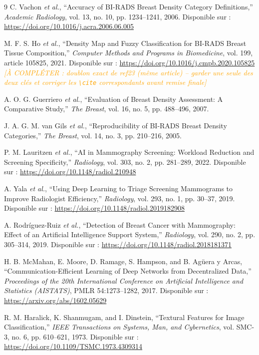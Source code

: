 \documentclass[12pt,a4paper]{report}
\newcommand{\todo}[1]{\textcolor{orange}{\textit{[À COMPLÉTER : #1]}}}
\begin{document}
\begin{thebibliography}{9}
C. Vachon \textit{et al.},
``Accuracy of BI-RADS Breast Density Category Definitions,''
\textit{Academic Radiology}, vol. 13, no. 10, pp. 1234--1241, 2006.
Disponible sur : \url{https://doi.org/10.1016/j.acra.2006.06.005}

M. F. S. Ho \textit{et al.},
``Density Map and Fuzzy Classification for BI-RADS Breast Tissue Composition,''
\textit{Computer Methods and Programs in Biomedicine}, vol. 199, article 105825, 2021.
Disponible sur : \url{https://doi.org/10.1016/j.cmpb.2020.105825}
\todo{doublon exact de ref23 (même article) -- garder une seule des deux
clés et corriger les \texttt{\textbackslash cite} correspondants avant
remise finale}

A. O. G. Guerriero \textit{et al.},
``Evaluation of Breast Density Assessment: A Comparative Study,''
\textit{The Breast}, vol. 16, no. 5, pp. 488--496, 2007.

J. A. G. M. van Gils \textit{et al.},
``Reproducibility of BI-RADS Breast Density Categories,''
\textit{The Breast}, vol. 14, no. 3, pp. 210--216, 2005.

P. M. Lauritzen \textit{et al.},
``AI in Mammography Screening: Workload Reduction and Screening Specificity,''
\textit{Radiology}, vol. 303, no. 2, pp. 281--289, 2022.
Disponible sur : \url{https://doi.org/10.1148/radiol.210948}

A. Yala \textit{et al.},
``Using Deep Learning to Triage Screening Mammograms to Improve Radiologist Efficiency,''
\textit{Radiology}, vol. 293, no. 1, pp. 30--37, 2019.
Disponible sur : \url{https://doi.org/10.1148/radiol.2019182908}

A. Rodríguez-Ruiz \textit{et al.},
``Detection of Breast Cancer with Mammography: Effect of an Artificial Intelligence Support System,''
\textit{Radiology}, vol. 290, no. 2, pp. 305--314, 2019.
Disponible sur : \url{https://doi.org/10.1148/radiol.2018181371}

H. B. McMahan, E. Moore, D. Ramage, S. Hampson, and B. Agüera y Arcas,
``Communication-Efficient Learning of Deep Networks from Decentralized Data,''
\textit{Proceedings of the 20th International Conference on Artificial Intelligence and Statistics (AISTATS)}, PMLR 54:1273--1282, 2017.
Disponible sur : \url{https://arxiv.org/abs/1602.05629}

R. M. Haralick, K. Shanmugam, and I. Dinstein,
``Textural Features for Image Classification,''
\textit{IEEE Transactions on Systems, Man, and Cybernetics}, vol. SMC-3, no. 6, pp. 610--621, 1973.
Disponible sur : \url{https://doi.org/10.1109/TSMC.1973.4309314}


\end{thebibliography}
\end{document}
